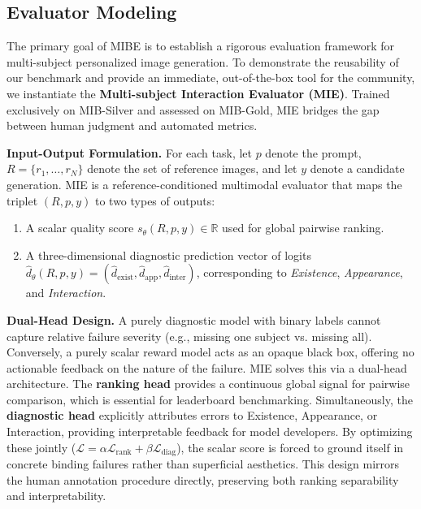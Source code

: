 \documentclass{article}
\begin{document}
\subsection{Evaluator Modeling}

The primary goal of MIBE is to establish a rigorous evaluation framework for multi-subject personalized image generation. To demonstrate the reusability of our benchmark and provide an immediate, out-of-the-box tool for the community, we instantiate the \textbf{Multi-subject Interaction Evaluator (MIE)}. Trained exclusively on MIB-Silver and assessed on MIB-Gold, MIE bridges the gap between human judgment and automated metrics.

\textbf{Input-Output Formulation.}
For each task, let $p$ denote the prompt, $R=\{r_1,\dots,r_N\}$ denote the set of reference images, and let $y$ denote a candidate generation. MIE is a reference-conditioned multimodal evaluator that maps the triplet $(R,p,y)$ to two types of outputs:
\begin{enumerate}
    \item A scalar quality score $s_\theta(R,p,y)\in\mathbb{R}$ used for global pairwise ranking.
    \item A three-dimensional diagnostic prediction vector of logits
    $\hat d_\theta(R,p,y) = (\hat d_{\text{exist}}, \hat d_{\text{app}}, \hat d_{\text{inter}})$,
    corresponding to \emph{Existence}, \emph{Appearance}, and \emph{Interaction}.
\end{enumerate}

\textbf{Dual-Head Design.} 
A purely diagnostic model with binary labels cannot capture relative failure severity (e.g., missing one subject vs. missing all). Conversely, a purely scalar reward model acts as an opaque black box, offering no actionable feedback on the nature of the failure. MIE solves this via a dual-head architecture. The \textbf{ranking head} provides a continuous global signal for pairwise comparison, which is essential for leaderboard benchmarking. Simultaneously, the \textbf{diagnostic head} explicitly attributes errors to Existence, Appearance, or Interaction, providing interpretable feedback for model developers. By optimizing these jointly ($\mathcal{L} = \alpha \mathcal{L}_{\text{rank}} + \beta \mathcal{L}_{\text{diag}}$), the scalar score is forced to ground itself in concrete binding failures rather than superficial aesthetics. This design mirrors the human annotation procedure directly, preserving both ranking separability and interpretability.
\end{document}
